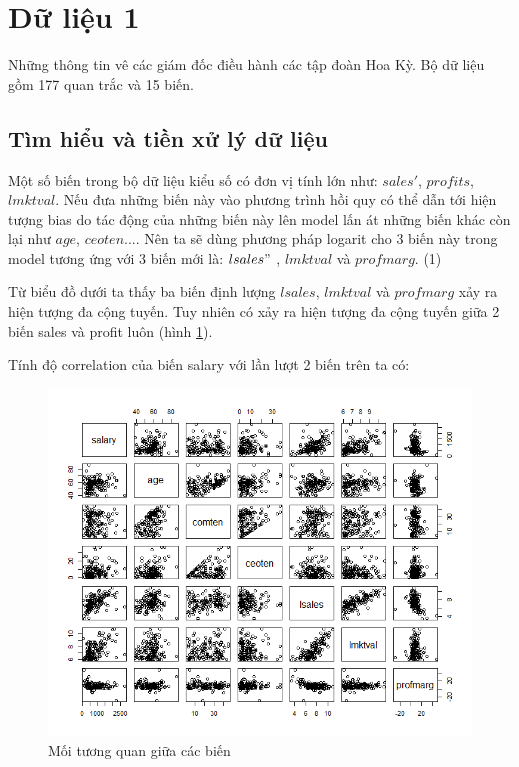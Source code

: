 \section{Dữ liệu 1}
Những thông tin vê các giám đốc điều hành các tập đoàn Hoa Kỳ. Bộ dữ liệu gồm 177 quan trắc và 15 biến.

\subsection*{Tìm hiểu và tiền xử lý dữ liệu}

Một số biến trong bộ dữ liệu kiểu số có đơn vị tính lớn như: $sales'$, $profits$, $lmktval$. Nếu đưa những biến này vào phương trình hồi quy có thể dẫn tới hiện tượng bias do tác động của những biến này lên model lấn át những biến khác còn lại như $age$, $ceoten$.... Nên ta sẽ dùng phương pháp logarit cho 3 biến này trong model tương ứng với 3 biến mới là:  $lsales"$ , $lmktval$   và $profmarg$. (1)


Từ biểu đồ dưới ta thấy ba biến định lượng $\textit{lsales}$, $\textit{lmktval}$ và $\textit{profmarg}$ xảy ra hiện tượng đa cộng tuyến.
Tuy nhiên có xảy ra hiện tượng đa cộng tuyến giữa 2 biến sales và profit luôn (hình \ref{fig-b1:plot-vars}).

Tính độ correlation của biến salary với lần lượt 2 biến trên ta có:

\begin{figure}[!h]
	\centering
	\includegraphics[scale = 0.7]{../Photo Of Result/B1_plotVriables.png}  
	\caption{Mối tương quan giữa các biến}
	\label{fig-b1:plot-vars}
\end{figure}

